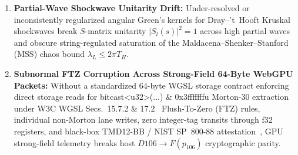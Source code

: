 \documentclass[11pt,a4paper,reqno]{article}
\def\texttt#1{#1}%
\def\mathbb#1{#1}%
\def\F#1{F(#1)}%
\def\Done{D106}%
\theoremstyle{plain}
\theoremstyle{definition}
\theoremstyle{remark}
\numberwithin{equation}{section}
\numberwithin{table}{section}
\newcommand{\F}[1]{\mathbb{F}_{#1}}
\newcommand{\Done}{\mathbb{D}_{106}}
\begin{document}
\begin{enumerate}[label=\textbf{(\arabic*)}, leftmargin=2.2em, before=\raggedright]
  \item \textbf{Partial-Wave Shockwave Unitarity Drift:} Under-resolved or inconsistently regularized angular Green's kernels for Dray--'t~Hooft Kruskal shockwaves break $S$-matrix unitarity $|S_l(s)|^2 = 1$ across high partial waves and obscure string-regulated saturation of the Maldacena--Shenker--Stanford (MSS) chaos bound $\lambda_L \le 2\pi T_H$.
  \item \textbf{Subnormal FTZ Corruption Across Strong-Field 64-Byte WebGPU Packets:} Without a standardized $64$-byte WGSL storage contract enforcing direct storage reads for \texttt{bitcast<u32>(...) \& 0x3fffffffu} Morton-30 extraction under W3C WGSL Secs.~15.7.2 \& 17.2~\cite{W3CWGSL2026} Flush-To-Zero (FTZ) rules, individual non-Morton lane writes, zero integer-tag transits through \texttt{f32} registers, and black-box \texttt{TMD12-BB} / NIST SP~800-88 attestation~\cite{TMDHashV122026,NISTSP80088}, GPU strong-field telemetry breaks host $\Done \to \F{p_{106}}$ cryptographic parity.
\end{enumerate}
\end{document}
